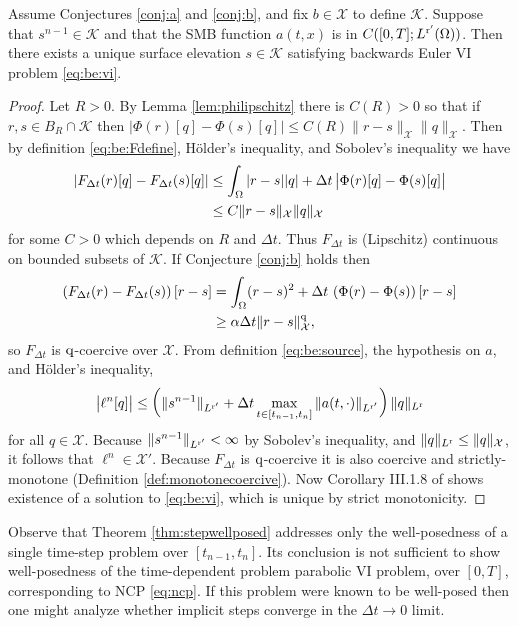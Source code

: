 \documentclass[hidelinks,onefignum,onetabnum,final]{siamart220329}  %
\newcommand{\cK}{\mathcal{K}}
\newcommand{\cX}{\mathcal{X}}
\newcommand{\qq}{{\text{\textnormal{q}}}}
\newcommand{\rr}{{\text{\textnormal{r}}}}
\begin{document}
\begin{theorem} \label{thm:stepwellposed}  Assume Conjectures \ref{conj:a} and \ref{conj:b}, and fix $b \in \cX$ to define $\cK$.  Suppose that $s^{n-1}\in\cK$ and that the SMB function $a(t,x)$ is in $C([0,T]; L^{\rr'}(\Omega))$.  Then there exists a unique surface elevation $s\in\cK$ satisfying backwards Euler VI problem \eqref{eq:be:vi}. \end{theorem}

\begin{proof}  Let $R>0$.  By Lemma \ref{lem:philipschitz} there is $C(R)>0$ so that if $r,s\in B_R\cap\cK$ then $\big|\Phi(r)[q] - \Phi(s)[q]\big| \le C(R) \|r-s\|_{\cX} \|q\|_{\cX}$.  Then by definition \eqref{eq:be:Fdefine}, H\"older's inequality, and Sobolev's inequality we have
\begin{align}
\left|F_{\Delta t}(r)[q] - F_{\Delta t}(s)[q]\right| &\le \int_\Omega |r-s||q| + \Delta t\, \big|\Phi(r)[q] - \Phi(s)[q]\big| \\
    &\le C \|r-s\|_{\cX} \|q\|_\cX \notag
\end{align}
for some $C>0$ which depends on $R$ and $\Delta t$.  Thus $F_{\Delta t}$ is (Lipschitz) continuous on bounded subsets of $\cK$.  If Conjecture \ref{conj:b} holds then
\begin{align}
\left(F_{\Delta t}(r) - F_{\Delta t}(s)\right)[r-s] &= \int_\Omega (r-s)^2 + \Delta t\, \left(\Phi(r) - \Phi(s)\right)[r-s] \\
    &\ge \alpha\Delta t \|r-s\|_{\cX}^\qq, \notag
\end{align}
so $F_{\Delta t}$ is $\qq$-coercive over $\cX$.  From definition \eqref{eq:be:source}, the hypothesis on $a$, and H\"older's inequality,
\begin{equation}
\big|\ell^n[q]\big| \le \left(\|s^{n-1}\|_{L^{\rr'}} + \Delta t \max_{t\in[t_{n-1},t_n]} \|a(t,\cdot)\|_{L^{\rr'}}\right) \|q\|_{L^\rr}
\label{eq:sourcetermbound}
\end{equation}
for all $q \in \cX$.  Because $\|s^{n-1}\|_{L^{\rr'}}<\infty$ by Sobolev's inequality, and $\|q\|_{L^\rr} \le \|q\|_{\cX}$, it follows that $\ell^n \in \cX'$.  Because $F_{\Delta t}$ is $\qq$-coercive it is also coercive and strictly-monotone (Definition \ref{def:monotonecoercive}).  Now Corollary III.1.8 of \cite{KinderlehrerStampacchia1980} shows existence of a solution to \eqref{eq:be:vi}, which is unique by strict monotonicity.
\end{proof}

Observe that Theorem \ref{thm:stepwellposed} addresses only the well-posedness of a single time-step problem over $[t_{n-1},t_n]$.  Its conclusion is not sufficient to show well-posedness of the time-dependent problem parabolic VI problem, over $[0,T]$, corresponding to NCP \eqref{eq:ncp}.  If this problem were known to be well-posed then one might analyze whether implicit steps converge in the $\Delta t\to 0$ limit.
\end{document}
